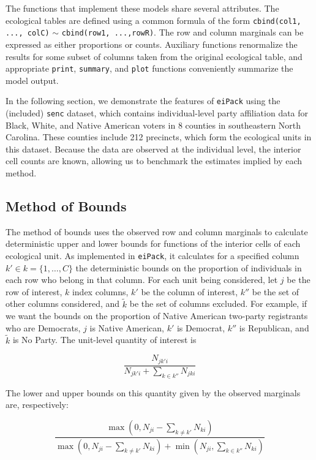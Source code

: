\documentclass[12pt]{article}
\begin{document}
The functions that implement these models share
several attributes.  The ecological tables are defined using a
common formula of the form \texttt{cbind(col1, ..., colC)} $\sim$
\texttt{cbind(row1, ...,rowR)}.  The row and column marginals can be
expressed as either proportions or counts.  Auxiliary functions
renormalize the results for some subset of columns taken from the
original ecological table, and appropriate \texttt{print},
\texttt{summary}, and \texttt{plot} functions conveniently summarize
the model output.

In the following section, we demonstrate the features of
\texttt{eiPack} using the (included) \texttt{senc} dataset, which
contains individual-level party affiliation data for Black, White, and
Native American voters in 8 counties in southeastern North Carolina.
These counties include 212 precincts, which form the ecological units
in this dataset.  Because the data are observed at the individual
level, the interior cell counts are known, allowing us to benchmark
the estimates implied by each method.

\subsection{Method of Bounds}

The method of bounds \citep{DunDav53} uses the observed row and column
marginals to calculate deterministic upper and lower bounds for
functions of the interior cells of each ecological unit.  As
implemented in \texttt{eiPack}, it calculates for a specified column $k'
\in k = \{1, \dots, C\}$ the deterministic bounds on the proportion of
individuals in each row who belong in that column.  For each
unit being considered, let $j$ be the row of interest, $k$ index
columns, $k'$ be the column of interest, $k''$ be the set of other
columns considered, and $\tilde{k}$ be the set of columns excluded.
For example, if we want the bounds on the proportion of Native
American two-party registrants who are Democrats, $j$ is Native
American, $k'$ is Democrat, $k''$ is Republican, and $\tilde{k}$ is No
Party.  The unit-level quantity of interest is

\begin{displaymath}
\frac{N_{jk'i}}{N_{jk'i} + \sum_{k \in k''} N_{jki}}
\end{displaymath}

\noindent The lower and upper bounds on this quantity given by the
observed marginals are, respectively:

\begin{displaymath}
\frac{\max(0, N_{ji} - \sum_{k \neq k'} N_{ki})}{\max(0, N_{ji} - \sum_{k \neq
k'} N_{ki}) + \min(N_{ji}, \sum_{k \in k''} N_{ki})}
\end{displaymath}
\end{document}
